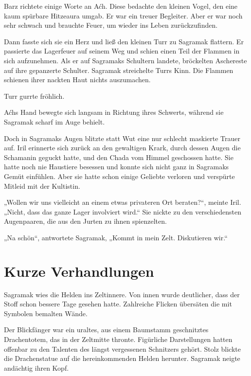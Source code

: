 Barz richtete einige Worte an Aćh. Diese bedachte den kleinen Vogel, den eine kaum spürbare Hitzeaura umgab. Er war ein treuer Begleiter. Aber er war noch sehr schwach und brauchte Feuer, um wieder ins Leben zurückzufinden.

Dann fasste sich sie ein Herz und ließ den kleinen Turr zu Sagramak flattern. Er passierte das Lagerfeuer auf seinem Weg und schien einen Teil der Flammen in sich aufzunehmen. Als er auf Sagramaks Schultern landete, bröckelten Aschereste auf ihre gepanzerte Schulter. Sagramak streichelte Turrs Kinn. Die Flammen schienen ihrer nackten Haut nichts auszumachen.

Turr gurrte fröhlich.

Aćhs Hand bewegte sich langsam in Richtung ihres Schwerts, während sie Sagramak scharf im Auge behielt.

Doch in Sagramaks Augen blitzte statt Wut eine nur schlecht maskierte Trauer auf. Iril erinnerte sich zurück an den gewaltigen Krark, durch dessen Augen die Schamanin geguckt hatte, und den Chada vom Himmel geschossen hatte. Sie hatte noch nie Haustiere besessen und konnte sich nicht ganz in Sagramaks Gemüt einfühlen. Aber sie hatte schon einige Geliebte verloren und verspürte Mitleid mit der Kultistin.

„Wollen wir uns vielleicht an einem etwas privateren Ort beraten?“, meinte Iril. „Nicht, dass das ganze Lager involviert wird.“ Sie nickte zu den verschiedensten Augenpaaren, die aus den Jurten zu ihnen spienzelten.

„Na schön“, antwortete Sagramak, „Kommt in mein Zelt. Diskutieren wir.“











\newpage
\section{Kurze Verhandlungen}



Sagramak wies die Helden ins Zeltinnere. Von innen wurde deutlicher, dass der Stoff schon bessere Tage gesehen hatte. Zahlreiche Flicken übersäten die mit Symbolen bemalten Wände.

Der Blickfänger war ein uraltes, aus einem Baumstamm geschnitztes Drachentotem, das in der Zeltmitte thronte. Figürliche Darstellungen hatten offenbar zu den Talenten des längst vergessenen Schnitzers gehört. Stolz blickte die Drachenstatue auf die hereinkommenden Helden herunter. Sagramak neigte andächtig ihren Kopf.

